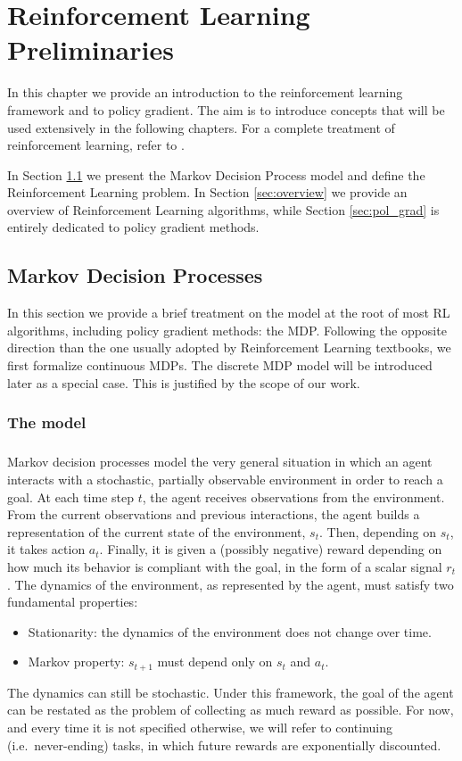 \chapter{Reinforcement Learning Preliminaries}
In this chapter we provide an introduction to the reinforcement learning framework and to policy gradient.
The aim is to introduce concepts that will be used extensively in the following chapters. For a complete treatment of reinforcement learning, refer to \cite{Sutton:1998:IRL:551283}.

In Section \ref{sec:MDP} we present the Markov Decision Process model and define the Reinforcement Learning problem. In Section \ref{sec:overview} we provide an overview of Reinforcement Learning algorithms, while Section \ref{sec:pol_grad} is entirely dedicated to policy gradient methods.

\section{Markov Decision Processes}\label{sec:MDP}
In this section we provide a brief treatment on the model at the root of most \ac{RL} algorithms, including policy gradient methods: the \ac{MDP}.  
Following the opposite direction than the one usually adopted by Reinforcement Learning textbooks, we first formalize continuous \ac{MDP}s. The discrete \ac{MDP} model will be introduced later as a special case. This is justified by the scope of our work.

\subsection{The model}
\paragraph{} %
Markov decision processes model the very general situation in which an agent interacts with a stochastic, partially observable environment in order to reach a goal. At each time step $t$, the agent receives observations from the environment. From the current observations and previous interactions, the agent builds a representation of the current state of the environment, $s_t$. Then, depending on $s_t$, it takes action $a_t$. Finally, it is given a (possibly negative) reward depending on how much its behavior is compliant with the goal, in the form of a scalar signal $r_t$. The dynamics of the environment, as represented by the agent, must satisfy two fundamental properties:
\begin{itemize}
\item Stationarity: the dynamics of the environment does not change over time.
\item Markov property: $s_{t+1}$ must depend only on $s_t$ and $a_t$.
\end{itemize}
The dynamics can still be stochastic.
Under this framework, the goal of the agent can be restated as the problem of collecting as much reward as possible. For now, and every time it is not specified otherwise, we will refer to continuing (i.e.\ never-ending) tasks, in which future rewards are exponentially discounted.

